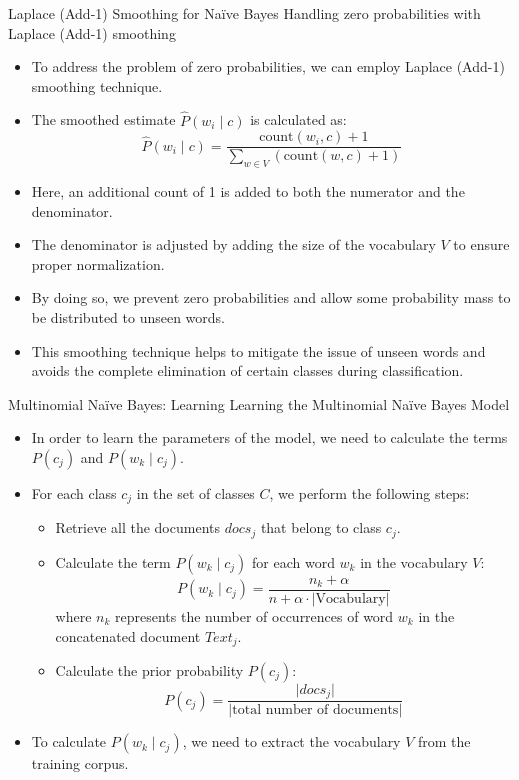 \documentclass[handout]{beamer}
\begin{document}
\begin{frame}{Laplace (Add-1) Smoothing for Naïve Bayes}
\scriptsize
Handling zero probabilities with Laplace (Add-1) smoothing
\begin{itemize}
    \item To address the problem of zero probabilities, we can employ Laplace (Add-1) smoothing technique.
    \item The smoothed estimate $\hat{P}(w_i \mid c)$ is calculated as:
    \[
    \hat{P}(w_i \mid c) = \frac{\text{count}(w_i, c) + 1}{\sum_{w \in V} (\text{count}(w, c) + 1)}
    \]
    \item Here, an additional count of 1 is added to both the numerator and the denominator.
    \item The denominator is adjusted by adding the size of the vocabulary $V$ to ensure proper normalization.
    \item By doing so, we prevent zero probabilities and allow some probability mass to be distributed to unseen words.
    \item This smoothing technique helps to mitigate the issue of unseen words and avoids the complete elimination of certain classes during classification.
\end{itemize}
\end{frame}

\begin{frame}{Multinomial Naïve Bayes: Learning}
\scriptsize
Learning the Multinomial Naïve Bayes Model
\begin{itemize}
    \item In order to learn the parameters of the model, we need to calculate the terms $P(c_j)$ and $P(w_k \mid c_j)$.
    \item For each class $c_j$ in the set of classes $C$, we perform the following steps:
    \begin{itemize}
        \item Retrieve all the documents $docs_j$ that belong to class $c_j$.
        \item Calculate the term $P(w_k \mid c_j)$ for each word $w_k$ in the vocabulary $V$:
        \[
        P(w_k \mid c_j) = \frac{{n_k + \alpha}}{{n + \alpha \cdot \lvert \text{Vocabulary} \rvert}}
        \]
        where $n_k$ represents the number of occurrences of word $w_k$ in the concatenated document $Text_j$.
        \item Calculate the prior probability $P(c_j)$:
        \[
        P(c_j) = \frac{{\lvert docs_j \rvert}}{{\lvert \text{total number of documents} \rvert}}
        \]
    \end{itemize}
    \item To calculate $P(w_k \mid c_j)$, we need to extract the vocabulary $V$ from the training corpus.
\end{itemize}
\end{frame}
\end{document}
